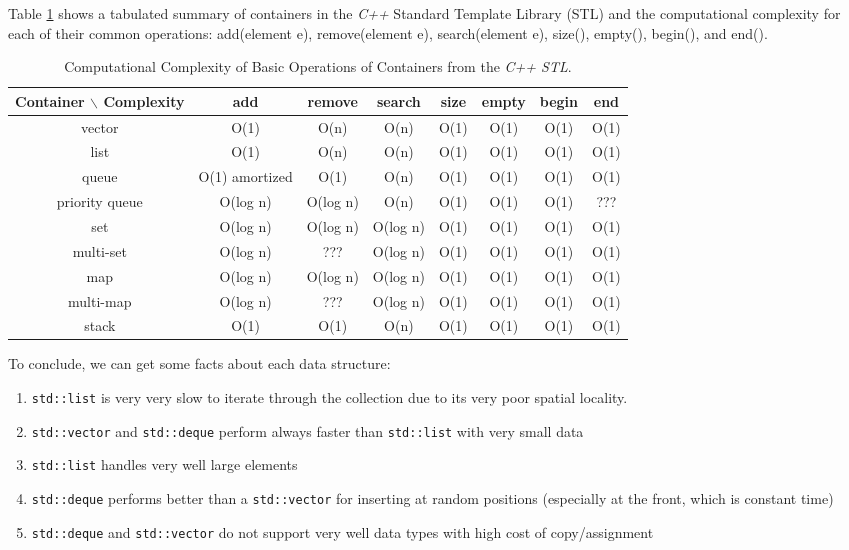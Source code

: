 Table \ref{tab:ComputationalComplexityofCppContainers} shows a tabulated summary of containers in the {\it C++} Standard Template Library (STL) and the computational complexity for each of their common operations: add(element e), remove(element e), search(element e), size(), empty(), begin(), and end(). \\

\begin{table}[htp]
\caption{Computational Complexity of Basic Operations of Containers from the {\it C++ STL}.}	\vspace{-0.2in}
\label{tab:ComputationalComplexityofCppContainers}
	\begin{center}
		\begin{tabular}{|c|c|c|c|c|c|c|c|}
		\hline
		Container $\backslash$ Complexity & add & remove & search & size & empty & begin & end \\
		\hline
		vector & O(1) & O(n) & O(n) & O(1) & O(1) & O(1) & O(1) \\
		\hline
		list & O(1) & O(n) & O(n) & O(1) & O(1) & O(1) & O(1) \\
		\hline
		queue & O(1) amortized & O(1) & O(n) & O(1) & O(1) & O(1) & O(1) \\
		\hline
		priority queue & O(log n) & O(log n) & O(n) & O(1) & O(1) & O(1) & ??? \\
		\hline
		set & O(log n) & O(log n) & O(log n) & O(1) & O(1) & O(1) & O(1) \\
		\hline
		multi-set & O(log n) & ??? & O(log n) & O(1) & O(1) & O(1) & O(1) \\
		\hline
		map & O(log n) & O(log n) & O(log n) & O(1) & O(1) & O(1) & O(1) \\
		\hline
		multi-map & O(log n) & ??? & O(log n) & O(1) & O(1) & O(1) & O(1) \\
		\hline
		stack & O(1) & O(1) & O(n) & O(1) & O(1) & O(1) & O(1) \\
		\hline
		\end{tabular}
	\end{center}
\end{table}


To conclude, we can get some facts about each data structure: \vspace{-0.3cm}
\begin{enumerate} \itemsep -4pt
\item {\tt std::list} is very very slow to iterate through the collection due to its very poor spatial locality.
\item {\tt std::vector} and {\tt std::deque} perform always faster than {\tt std::list} with very small data
\item {\tt std::list} handles very well large elements
\item {\tt std::deque} performs better than a {\tt std::vector} for inserting at random positions (especially at the front, which is constant time)
\item {\tt std::deque} and {\tt std::vector} do not support very well data types with high cost of copy/assignment
\end{enumerate}



